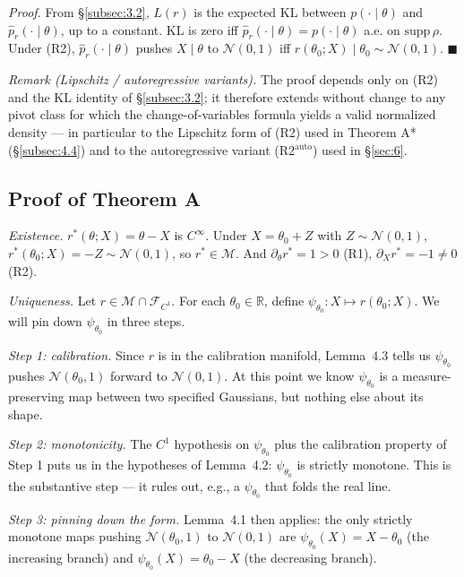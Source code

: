 \documentclass[11pt]{article}
\begin{document}
\emph{Proof.} From \S\ref{subsec:3.2}, \(L(r)\) is the expected KL between
\(p(\cdot \mid \theta)\) and \(\hat p_r(\cdot \mid \theta)\), up to a
constant. KL is zero iff
\(\hat p_r(\cdot \mid \theta) = p(\cdot \mid \theta)\) a.e. on
\(\mathrm{supp}\,\rho\). Under (R2), \(\hat p_r(\cdot \mid \theta)\)
pushes \(X \mid \theta\) to \(\mathcal{N}(0,1)\) iff
\(r(\theta_0; X) \mid \theta_0 \sim \mathcal{N}(0,1)\). \(\blacksquare\)

\emph{Remark (Lipschitz / autoregressive variants).} The proof depends
only on (R2) and the KL identity of \S\ref{subsec:3.2}; it therefore
extends without change to any pivot class for which the change-of-variables
formula yields a valid normalized density --- in particular to the
Lipschitz form of (R2) used in Theorem A* (\S\ref{subsec:4.4}) and to the
autoregressive variant (R2\(^{\mathrm{auto}}\)) used in \S\ref{sec:6}.

\subsection{Proof of Theorem A}\label{subsec:4.3}

\emph{Existence.} \(r^*(\theta; X) = \theta - X\) is \(C^\infty\). Under
\(X = \theta_0 + Z\) with \(Z \sim \mathcal{N}(0,1)\),
\(r^*(\theta_0; X) = -Z \sim \mathcal{N}(0,1)\), so
\(r^* \in \mathcal{M}\). And \(\partial_\theta r^* = 1 > 0\) (R1),
\(\partial_X r^* = -1 \neq 0\) (R2).

\emph{Uniqueness.} Let \(r \in \mathcal{M} \cap \mathcal{F}_{C^1}\). For
each \(\theta_0 \in \mathbb{R}\), define
\(\psi_{\theta_0}: X \mapsto r(\theta_0; X)\). We will pin down
\(\psi_{\theta_0}\) in three steps.

\emph{Step 1: calibration.} Since \(r\) is in the calibration manifold,
Lemma~4.3 tells us \(\psi_{\theta_0}\) pushes \(\mathcal{N}(\theta_0, 1)\)
forward to \(\mathcal{N}(0, 1)\). At this point we know
\(\psi_{\theta_0}\) is a measure-preserving map between two specified
Gaussians, but nothing else about its shape.

\emph{Step 2: monotonicity.} The \(C^1\) hypothesis on
\(\psi_{\theta_0}\) plus the calibration property of Step 1 puts us in
the hypotheses of Lemma~4.2: \(\psi_{\theta_0}\) is strictly monotone.
This is the substantive step --- it rules out, e.g., a
\(\psi_{\theta_0}\) that folds the real line.

\emph{Step 3: pinning down the form.} Lemma~4.1 then applies: the only
strictly monotone maps pushing \(\mathcal{N}(\theta_0, 1)\) to
\(\mathcal{N}(0, 1)\) are \(\psi_{\theta_0}(X) = X - \theta_0\) (the
increasing branch) and \(\psi_{\theta_0}(X) = \theta_0 - X\) (the
decreasing branch).
\end{document}
